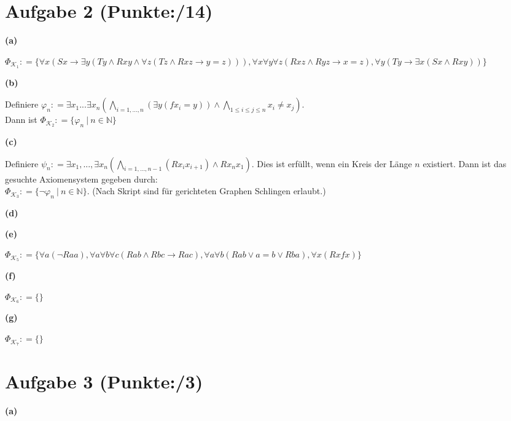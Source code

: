 \documentclass[11pt, a4paper]{article}
\newcommand{\p}{14}
\newcommand{\pp}{3}
\newcommand{\defgr}{\mathrel{\mathop:\!\!=}}
\begin{document}
\section*{Aufgabe 2 (Punkte:\qquad/\p)}
\textbf{(a)}
\begin{adjustwidth}{20pt}{20pt}
	$\Phi_{\mathcal{K}_1} \defgr \{\forall x(Sx \rightarrow \exists y(Ty \wedge Rxy \wedge \forall z(Tz \wedge Rxz \rightarrow y=z))),
	\forall x\forall y\forall z(Rxz \wedge Ryz \rightarrow x=z), \forall y(Ty \rightarrow \exists x(Sx \wedge Rxy))\}$
\end{adjustwidth}
\textbf{(b)}
\begin{adjustwidth}{20pt}{20pt}
	Definiere $\varphi_n \defgr \exists x_1...\exists x_n\left(\bigwedge_{i=1,...,n}(\exists y(fx_i = y)) \wedge \bigwedge_{1\leq i \leq j \leq n}x_i \neq x_j\right)$.\\ Dann ist
	$\Phi_{\mathcal{K}_2} \defgr \{ \varphi_n\ |\ n \in \mathbb{N}\}$
\end{adjustwidth}
\textbf{(c)}
\begin{adjustwidth}{20pt}{20pt}
	Definiere $\psi_n \defgr \exists x_1,...,\exists x_n(\bigwedge_{i=1,...,n-1}(Rx_ix_{i+1}) \wedge Rx_nx_1)$. Dies ist erfüllt, wenn ein Kreis der Länge $n$ existiert.
	Dann ist das gesuchte Axiomensystem gegeben durch:\\
	$\Phi_{\mathcal{K}_3} \defgr \{ \neg\varphi_n\ |\ n \in \mathbb{N}\}$. (Nach Skript sind für gerichteten Graphen Schlingen erlaubt.)
\end{adjustwidth}
\textbf{(d)}
\begin{adjustwidth}{20pt}{20pt}
	
\end{adjustwidth}
\textbf{(e)}
\begin{adjustwidth}{20pt}{20pt}
	$\Phi_{\mathcal{K}_5} \defgr \{\forall a(\neg Raa), \forall a\forall b \forall c(Rab \wedge Rbc \rightarrow Rac), \forall a \forall b(Rab \vee a=b \vee Rba), \forall x(Rxfx)\}$
\end{adjustwidth}
\textbf{(f)}
\begin{adjustwidth}{20pt}{20pt}
	$\Phi_{\mathcal{K}_6} \defgr \{ \}$
\end{adjustwidth}
\textbf{(g)}
\begin{adjustwidth}{20pt}{20pt}
	$\Phi_{\mathcal{K}_7} \defgr \{ \}$
\end{adjustwidth}




\section*{Aufgabe 3 (Punkte:\qquad/\pp)}
\textbf{(a)}
\begin{adjustwidth}{20pt}{20pt}
	
\end{adjustwidth}
\end{document}
